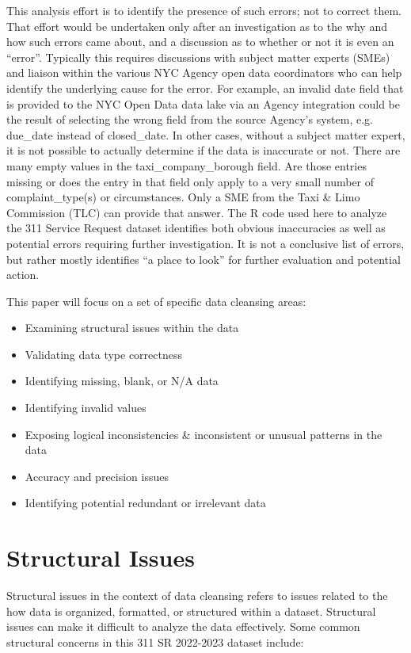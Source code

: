 \documentclass[12pt, titlepage]{article}
\begin{document}
This analysis effort is to identify the presence of such errors; not to correct them. 
That effort would be undertaken only after an investigation as to the why
and how such errors came about, and a discussion as to whether or not it 
is even an ``error''. Typically this requires discussions with subject matter 
experts (SMEs) and liaison within the various NYC Agency open data 
coordinators who can help identify the underlying cause for the error. 
For example, an invalid date field that is provided to the NYC Open Data 
data lake via an Agency integration could be the result of selecting 
the wrong field from the source Agency's system, e.g. 
due\_date instead of closed\_date. In other cases, without a subject matter
expert, it is not possible to actually determine if the data is inaccurate or not. 
There are many empty values in the taxi\_company\_borough field. Are those
entries missing or does the entry in that field only apply to a 
very small number of complaint\_type(s) or circumstances. Only a SME
from the Taxi \& Limo Commission (TLC) can provide that answer. 
The R code used here to analyze the 311 Service Request dataset identifies
both obvious inaccuracies as well as potential errors requiring further 
investigation. It is not a conclusive list of errors, but rather mostly identifies
``a place to look'' for further evaluation and potential action.

This paper will focus on a set of specific data cleansing areas:

\begin{itemize}
	\item Examining structural issues within the data
	\item Validating data type correctness
	\item Identifying missing, blank, or N/A data
	\item Identifying invalid values
	\item Exposing logical inconsistencies \& inconsistent or 
	unusual patterns in the data
	\item Accuracy and precision issues
	\item Identifying potential redundant or irrelevant data  
\end{itemize}



\section{Structural Issues}\label{sec:structural}
Structural issues in the context of data cleansing refers to issues 
related to the how data is organized, formatted, or structured within a dataset. Structural issues 
can make it difficult to analyze the data effectively. Some common 
structural concerns in this 311 SR 2022-2023 dataset include:
\end{document}
